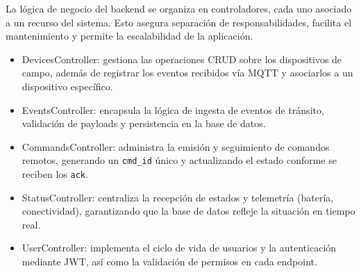 La lógica de negocio del backend se organiza en controladores, cada uno asociado a un recurso del sistema. Esto asegura separación de responsabilidades, facilita el mantenimiento y permite la escalabilidad de la aplicación.

\begin{itemize}
  \item DevicesController: gestiona las operaciones CRUD sobre los dispositivos de campo, además de registrar los eventos recibidos vía MQTT y asociarlos a un dispositivo específico.
  \item EventsController: encapsula la lógica de ingesta de eventos de tránsito, validación de payloads y persistencia en la base de datos.
  \item CommandsController: administra la emisión y seguimiento de comandos remotos, generando un \texttt{cmd\_id} único y actualizando el estado conforme se reciben los \texttt{ack}.
  \item StatusController: centraliza la recepción de estados y telemetría (batería, conectividad), garantizando que la base de datos refleje la situación en tiempo real.
  \item UserController: implementa el ciclo de vida de usuarios y la autenticación mediante JWT, así como la validación de permisos en cada endpoint.
\end{itemize}


